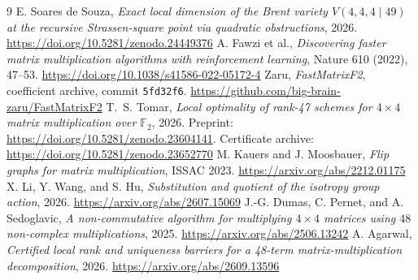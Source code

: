 \documentclass[11pt,reqno]{amsart}
\newcommand{\F}{\mathbb F}
\begin{document}
\enlargethispage{2\baselineskip}
\begin{thebibliography}{9}
 E. Soares de Souza, \emph{Exact local dimension of the Brent variety \(V(4,4,4\mid49)\) at the recursive Strassen-square point via quadratic obstructions}, 2026. \url{https://doi.org/10.5281/zenodo.24449376}
 A. Fawzi et al., \emph{Discovering faster matrix multiplication algorithms with reinforcement learning}, Nature 610 (2022), 47--53. \url{https://doi.org/10.1038/s41586-022-05172-4}
 Zaru, \emph{FastMatrixF2}, coefficient archive, commit \texttt{5fd32f6}. \url{https://github.com/big-brain-zaru/FastMatrixF2}
 T.~S. Tomar, \emph{Local optimality of rank-47 schemes for \(4\times4\) matrix multiplication over \(\F_2\)}, 2026. Preprint: \url{https://doi.org/10.5281/zenodo.23604141}. Certificate archive: \url{https://doi.org/10.5281/zenodo.23652770}
 M. Kauers and J. Moosbauer, \emph{Flip graphs for matrix multiplication}, ISSAC 2023. \url{https://arxiv.org/abs/2212.01175}
 X. Li, Y. Wang, and S. Hu, \emph{Substitution and quotient of the isotropy group action}, 2026. \url{https://arxiv.org/abs/2607.15069}
 J.-G. Dumas, C. Pernet, and A. Sedoglavic, \emph{A non-commutative algorithm for multiplying \(4\times4\) matrices using \(48\) non-complex multiplications}, 2025. \url{https://arxiv.org/abs/2506.13242}
 A. Agarwal, \emph{Certified local rank and uniqueness barriers for a 48-term matrix-multiplication decomposition}, 2026. \url{https://arxiv.org/abs/2609.13596}
\end{thebibliography}
\end{document}
